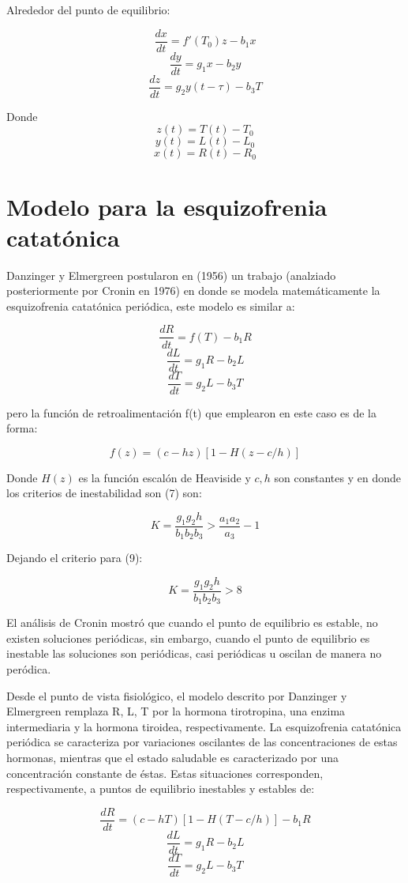 \documentclass[letter,11pt]{article}
\begin{document}
Alrededor del punto de equilibrio:

$$ \frac{dx}{dt} = f'(T_{0})z-b_{1}x$$
$$ \frac{dy}{dt} = g_{1}x-b_{2}y $$
$$ \frac{dz}{dt} = g_{2}y(t-\tau)-b_{3}T $$

Donde
$$ z(t)=T(t)-T_{0} $$
$$ y(t)=L(t)-L_{0} $$
$$ x(t)=R(t)-R_{0} $$

\section*{Modelo para la esquizofrenia catatónica}

Danzinger y Elmergreen postularon en (1956) un trabajo (analziado posteriormente por Cronin en 1976) en donde se modela matemáticamente la esquizofrenia catatónica periódica, este modelo es similar a:

$$ \frac{dR}{dt} = f(T)-b_{1}R$$
$$ \frac{dL}{dt} = g_{1}R-b_{2}L $$
$$ \frac{dT}{dt} = g_{2}L-b_{3}T $$

pero la función de retroalimentación f(t) que emplearon en este caso es de la forma:

$$ f(z) = (c-hz)[1-H(z-c/h)]  $$

Donde $H(z)$ es la función escalón de Heaviside y $c,h$ son constantes y en donde los criterios de inestabilidad son (7) son:

$$ K = \dfrac{g_1 g_2 h}{b_1 b_2 b_3} > \dfrac{a_1 a_2}{a_3} - 1 $$

Dejando el criterio para (9):

$$ K = \dfrac{g_1 g_2 h}{b_1 b_2 b_3} > 8 $$ 

El análisis de Cronin mostró que cuando el punto de equilibrio es estable, no existen soluciones periódicas, sin embargo, cuando el punto de equilibrio es inestable las soluciones son periódicas, casi periódicas u oscilan de manera no peródica.

Desde el punto de vista fisiológico, el modelo descrito por Danzinger y Elmergreen remplaza R, L, T por la hormona tirotropina, una enzima intermediaria y la hormona tiroidea, respectivamente. La esquizofrenia catatónica periódica se caracteriza por variaciones oscilantes de las concentraciones de estas hormonas, mientras que el estado saludable es caracterizado por una concentración constante de éstas. Estas situaciones corresponden, respectivamente, a puntos de equilibrio inestables y estables de:  

$$ \frac{dR}{dt} = (c-hT)[1-H(T-c/h)]-b_{1}R$$
$$ \frac{dL}{dt} = g_{1}R-b_{2}L $$
$$ \frac{dT}{dt} = g_{2}L-b_{3}T $$
\end{document}

